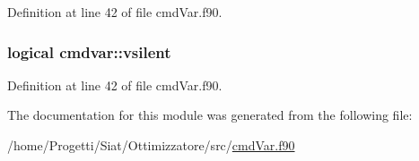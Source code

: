 Definition at line 42 of file cmd\-Var.\-f90.

\hypertarget{classcmdvar_a5d5ef4d5f7d8f3ec8c8e390e0f594ec1}{
\subsubsection[{vsilent}]{\setlength{\rightskip}{0pt plus 5cm}logical cmdvar\-::vsilent}}\label{classcmdvar_a5d5ef4d5f7d8f3ec8c8e390e0f594ec1}


Definition at line 42 of file cmd\-Var.\-f90.



The documentation for this module was generated from the following file\-:\begin{DoxyCompactItemize}
\item 
/home/\-Progetti/\-Siat/\-Ottimizzatore/src/\hyperlink{cmd_var_8f90}{cmd\-Var.\-f90}\end{DoxyCompactItemize}
